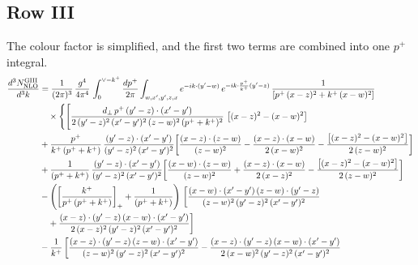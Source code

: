\documentclass[9pt]{article}
\numberwithin{equation}{section}
\begin{document}
\subsection{Row III}
The colour factor is simplified, and the first two terms are combined into one $p^{+}$ integral.
\begin{align}
\frac{d^{3}N^{\rm GIII}_{\rm NLO}}{d^{3}k}&=\frac{1}{(2\pi)^{3}}\,\frac{g^{4}}{4\pi^{4}}\,\int_{0}^{\vee-k^{+}}\frac{dp^{+}}{2\pi}\int_{w,x^{\prime},y^{\prime},z,x}e^{-ik\cdot(y^{\prime}-w)}\,e^{-ik\cdot\frac{p^{+}}{k^{+}}(y^{\prime}-z)}\,\frac{1}{\left[p^{+}\,(x-z)^{2}+k^{+}\,(x-w)^{2}\right]}\notag\\&\quad\times\Bigg\{\Bigg[\frac{d_{\perp}\,p^{+}\,(y^{\prime}-z)\cdot(x^{\prime}-y^{\prime})}{2\,(y^{\prime}-z)^{2}\,(x^{\prime}-y^{\prime})^{2}\,(z-w)^{2}\,(p^{+}+k^{+})^{2}}\, \left[(x-z)^{2}-(x-w)^{2}\right]\notag \\ & +\frac{p^{+}}{k^{+}\,(p^{+}+k^{+})}\,\frac{(y^{\prime}-z)\cdot(x^{\prime}-y^{\prime})}{(y^{\prime}-z)^{2}\,(x^{\prime}-y^{\prime})^{2}}\bigg[\frac{(x-z)\cdot (z-w)}{(z-w)^{2}} -\frac{(x-z)\cdot (x-w)}{2\,(x-w)^{2}}-\frac{\left[(x-z)^{2}-(x-w)^{2}\right]}{2\,(z-w)^{2}}\bigg]\notag \\ & +\frac{1}{(p^{+}+k^{+})}\,\frac{(y^{\prime}-z)\cdot(x^{\prime}-y^{\prime})}{(y^{\prime}-z)^{2}\,(x^{\prime}-y^{\prime})^{2}}\bigg[\frac{(x-w)\cdot (z-w)}{(z-w)^{2}}+\frac{(x-z)\cdot (x-w)}{2\,(x-z)^{2}} -\frac{\left[(x-z)^{2}-(x-w)^{2}\right]}{2\,(z-w)^{2}}\bigg]\notag \\ & -\left(\left[\frac{k^{+}}{p^{+}\,(p^{+}+k^{+})}\right]_{+}+\frac{1}{(p^{+}+k^{+})}\right)\,\bigg[\frac{(x-w)\cdot(x^{\prime}-y^{\prime})\,(z-w)\cdot(y^{\prime}-z)}{(z-w)^{2}\,(y^{\prime}-z)^{2}\,(x^{\prime}-y^{\prime})^{2}}\notag\\
&\quad +\frac{(x-z)\cdot(y^{\prime}-z)\,(x-w)\cdot(x^{\prime}-y^{\prime})}{2\,(x-z)^{2}\,(y^{\prime}-z)^{2}\,(x^{\prime}-y^{\prime})^{2}}\bigg]\notag \\ & -\frac{1}{k^{+}}\,\bigg[\frac{(x-z)\cdot(y^{\prime}-z)\,(z-w)\cdot(x^{\prime}-y^{\prime})}{(z-w)^{2}\,(y^{\prime}-z)^{2}\,(x^{\prime}-y^{\prime})^{2}}-\frac{(x-z)\cdot(y^{\prime}-z)\,(x-w)\cdot(x^{\prime}-y^{\prime})}{2\,(x-w)^{2}\,(y^{\prime}-z)^{2}\,(x^{\prime}-y^{\prime})^{2}}\notag\\

\end{align}
\end{document}
